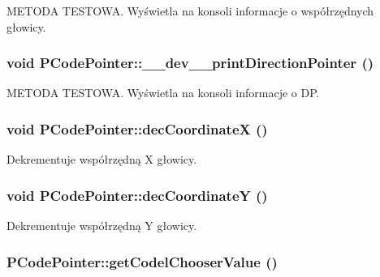 METODA TESTOWA. Wyświetla na konsoli informacje o współrzędnych głowicy. \hypertarget{classPCodePointer_103c79ebd3257261d5c72322bc4eb742}{
\subsubsection[{\_\-\_\-dev\_\-\_\-printDirectionPointer}]{\setlength{\rightskip}{0pt plus 5cm}void PCodePointer::\_\-\_\-dev\_\-\_\-printDirectionPointer ()}}
\label{classPCodePointer_103c79ebd3257261d5c72322bc4eb742}


METODA TESTOWA. Wyświetla na konsoli informacje o DP. \hypertarget{classPCodePointer_3b98e9637236aa9d975dc59c0397e625}{
\subsubsection[{decCoordinateX}]{\setlength{\rightskip}{0pt plus 5cm}void PCodePointer::decCoordinateX ()}}
\label{classPCodePointer_3b98e9637236aa9d975dc59c0397e625}


Dekrementuje współrzędną X głowicy. \hypertarget{classPCodePointer_cc8b95bb3786748c1aff41eed6d299e1}{
\subsubsection[{decCoordinateY}]{\setlength{\rightskip}{0pt plus 5cm}void PCodePointer::decCoordinateY ()}}
\label{classPCodePointer_cc8b95bb3786748c1aff41eed6d299e1}


Dekrementuje współrzędną Y głowicy. \hypertarget{classPCodePointer_529b0f2f65c1d17082d755813fec0194}{
\subsubsection[{getCodelChooserValue}]{ PCodePointer::getCodelChooserValue ()}}
\label{classPCodePointer_529b0f2f65c1d17082d755813fec0194}


